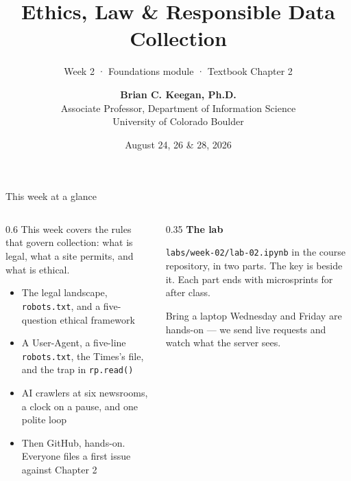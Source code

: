 \documentclass[9pt,aspectratio=169]{beamer}
\title[Week 2 · Ethics \& Law]{{\Huge Ethics, Law \& Responsible Data Collection}}
\subtitle{Week 2 · Foundations module · Textbook Chapter 2}
\author[Keegan]{\textbf{Brian C. Keegan, Ph.D.} \\ Associate Professor, Department of Information Science \\ University of Colorado Boulder}
\date{August 24, 26 \& 28, 2026}
\begin{document}
\maketitle

\begin{frame}{This week at a glance}
    \begin{columns}[T]
        \begin{column}{0.6\textwidth}
            This week covers the rules that govern collection: what is legal, what a site permits, and what is ethical.

            \bigskip

            \begin{itemize}\small
                \item The legal landscape, \texttt{robots.txt}, and a five-question ethical framework
            \end{itemize}

            \medskip

            \begin{itemize}\small
                \item A User-Agent, a five-line \texttt{robots.txt}, the Times's file, and the trap in \texttt{rp.read()}
            \end{itemize}

            \medskip

            \begin{itemize}\small
                \item AI crawlers at six newsrooms, a clock on a pause, and one polite loop
                \item Then GitHub, hands-on. Everyone files a first issue against Chapter 2
            \end{itemize}
        \end{column}
        \begin{column}{0.35\textwidth}
            \textbf{The lab}\\[2pt]
            {\footnotesize \texttt{labs/week-02/lab-02.ipynb} in the course repository, in two parts. The key is beside it. Each part ends with microsprints for after class.\par}
            \medskip
            \begin{alertblock}{Bring a laptop}
                \footnotesize Wednesday and Friday are hands-on --- we send live requests and watch what the server sees.
            \end{alertblock}
        \end{column}
    \end{columns}
\end{frame}
\end{document}
